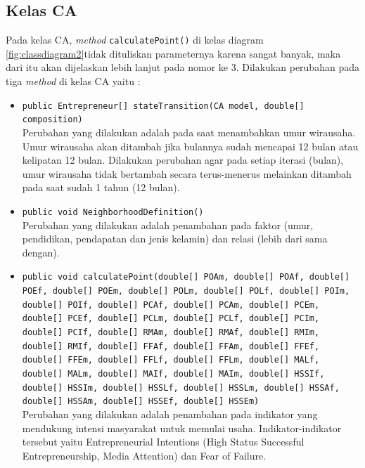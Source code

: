 \subsection{Kelas CA}
Pada kelas CA, \textit{method} \texttt{calculatePoint()} di kelas diagram \ref{fig:classdiagram2}tidak dituliskan parameternya karena sangat banyak, maka dari itu akan dijelaskan lebih lanjut pada nomor ke 3. Dilakukan perubahan pada tiga \textit{method} di kelas CA yaitu :
\begin{itemize}
	\item \texttt{public Entrepreneur[] stateTransition(CA model, double[] composition)}\\
	Perubahan yang dilakukan adalah pada saat menambahkan umur wirausaha. Umur wirausaha akan ditambah jika bulannya sudah mencapai 12 bulan atau kelipatan 12 bulan. Dilakukan perubahan agar pada setiap iterasi (bulan), umur wirausaha tidak bertambah secara terus-menerus melainkan ditambah pada saat sudah 1 tahun (12 bulan).
	\item \texttt{public void NeighborhoodDefinition() }\\
	Perubahan yang dilakukan adalah penambahan pada faktor (umur, pendidikan, pendapatan dan jenis kelamin) dan relasi (lebih dari sama dengan).
	\item \texttt{public void calculatePoint(double[] POAm, double[] POAf, double[] POEf, double[] POEm, double[] POLm, double[] POLf, double[] POIm, double[] POIf, double[] PCAf, double[] PCAm, double[] PCEm, double[] PCEf, double[] PCLm, double[] PCLf, double[] PCIm, double[] PCIf, double[] RMAm, double[] RMAf, double[] RMIm, double[] RMIf, double[] FFAf, double[] FFAm, double[] FFEf, double[] FFEm, double[] FFLf, double[] FFLm, double[] MALf, double[] MALm, double[] MAIf, double[] MAIm, double[] HSSIf, double[] HSSIm, double[] HSSLf, double[] HSSLm, double[] HSSAf, double[] HSSAm, double[] HSSEf, double[] HSSEm)}\\
		Perubahan yang dilakukan adalah penambahan pada indikator yang mendukung intensi masyarakat untuk memulai usaha. Indikator-indikator tersebut yaitu Entrepreneurial Intentions (High Status Successful Entrepreneurship, Media Attention) dan Fear of Failure.
\end{itemize}

